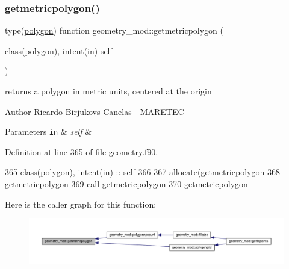 \mbox{\label{namespacegeometry__mod_aee5a288df947e30d7e46c37a2f7ca9d2}} 
\subsubsection{\texorpdfstring{getmetricpolygon()}{getmetricpolygon()}}
{\footnotesize\ttfamily type(\mbox{\hyperlink{structgeometry__mod_1_1polygon}{polygon}}) function geometry\+\_\+mod\+::getmetricpolygon (\begin{DoxyParamCaption}\item[{class(\mbox{\hyperlink{structgeometry__mod_1_1polygon}{polygon}}), intent(in)}]{self }\end{DoxyParamCaption})\hspace{0.3cm}{\ttfamily [private]}}



returns a polygon in metric units, centered at the origin 

\begin{DoxyAuthor}{Author}
Ricardo Birjukovs Canelas -\/ M\+A\+R\+E\+T\+EC 
\end{DoxyAuthor}

\begin{DoxyParams}[1]{Parameters}
\mbox{\tt in}  & {\em self} & \\
\hline
\end{DoxyParams}


Definition at line 365 of file geometry.\+f90.


\begin{DoxyCode}
365     \textcolor{keywordtype}{class}(polygon), \textcolor{keywordtype}{intent(in)} :: self
366 
367     \textcolor{keyword}{allocate}(getmetricpolygon%
368     getmetricpolygon%
369     \textcolor{keyword}{call }getmetricpolygon%
370     getmetricpolygon%
\end{DoxyCode}
Here is the caller graph for this function\+:\nopagebreak
\begin{figure}[H]
\begin{center}
\leavevmode
\includegraphics[width=350pt]{namespacegeometry__mod_aee5a288df947e30d7e46c37a2f7ca9d2_icgraph}
\end{center}
\end{figure}
\mbox{\label{namespacegeometry__mod_a524c5d28a80fb6729b102126485605ce}} 
